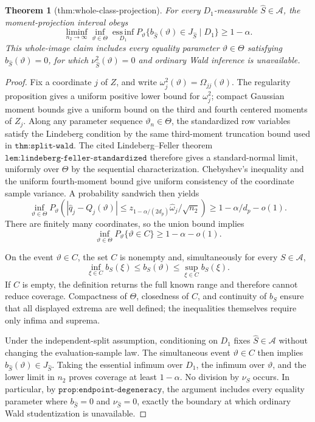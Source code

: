 \documentclass{article}
\newtheorem{theorem}{Theorem}
\begin{document}
\begin{theorem}[thm:whole-class-projection]\label{thm:whole-class-projection}
For every \(D_1\)-measurable \(\widehat S\in\mathcal A\), the moment-projection interval obeys \[\liminf_{n_2\to\infty}\inf_{\vartheta\in\Theta}\operatorname*{ess\,inf}_{D_1}P_{\vartheta}\{b_{\widehat S}(\vartheta)\in J_{\widehat S}\mid D_1\}\ge1-\alpha.\] This whole-image claim includes every equality parameter \(\vartheta\in\Theta\) satisfying \(b_{\widehat S}(\vartheta)=0\), for which \(\nu_{\widehat S}^2(\vartheta)=0\) and ordinary Wald inference is unavailable.
\end{theorem}
\begin{proof}
Fix a coordinate \(j\) of \(Z\), and write
\(\omega_j^2(\vartheta)=\Omega_{jj}(\vartheta)\).  The regularity proposition gives a uniform positive lower bound for \(\omega_j^2\); compact Gaussian moment bounds give a uniform bound on the third and fourth centered moments of \(Z_j\).  Along any parameter sequence \(\vartheta_n\in\Theta\), the standardized row variables satisfy the Lindeberg condition by the same third-moment truncation bound used in \(\texttt{thm:split-wald}\).  The cited Lindeberg--Feller theorem \(\texttt{lem:lindeberg-feller-standardized}\) therefore gives a standard-normal limit, uniformly over \(\Theta\) by the sequential characterization.  Chebyshev's inequality and the uniform fourth-moment bound give uniform consistency of the coordinate sample variance.  A probability sandwich then yields
\[
 \inf_{\vartheta\in\Theta}
 P_\vartheta\!\left(
 |\widehat q_j-Q_j(\vartheta)|
 \leq z_{1-\alpha/(2d_p)}\widehat\omega_j/\sqrt{n_2}
 \right)\geq1-\alpha/d_p-o(1).
\]
There are finitely many coordinates, so the union bound implies
\[
 \inf_{\vartheta\in\Theta}P_\vartheta\{\vartheta\in C\}
 \geq1-\alpha-o(1).
\]

On the event \(\vartheta\in C\), the set \(C\) is nonempty and, simultaneously for every \(S\in\mathcal A\),
\[
 \inf_{\xi\in C}b_S(\xi)\leq b_S(\vartheta)
 \leq\sup_{\xi\in C}b_S(\xi).
\]
If \(C\) is empty, the definition returns the full known range and therefore cannot reduce coverage.  Compactness of \(\Theta\), closedness of \(C\), and continuity of \(b_S\) ensure that all displayed extrema are well defined; the inequalities themselves require only infima and suprema.

Under the independent-split assumption, conditioning on \(D_1\) fixes \(\widehat S\in\mathcal A\) without changing the evaluation-sample law.  The simultaneous event \(\vartheta\in C\) then implies
\(b_{\widehat S}(\vartheta)\in J_{\widehat S}\).  Taking the essential infimum over \(D_1\), the infimum over \(\vartheta\), and the lower limit in \(n_2\) proves coverage at least \(1-\alpha\).  No division by \(\nu_S\) occurs.  In particular, by \(\texttt{prop:endpoint-degeneracy}\), the argument includes every equality parameter where \(b_{\widehat S}=0\) and \(\nu_{\widehat S}=0\), exactly the boundary at which ordinary Wald studentization is unavailable.
\end{proof}
\end{document}
